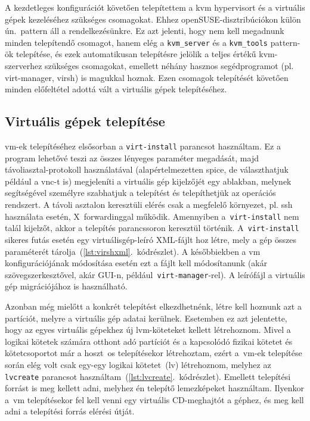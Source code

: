 A kezdetleges konfigurációt követően telepítettem a \acrshort{kvm} \gls{hypervisor}t és a virtuális gépek kezeléséhez szükséges csomagokat. Ehhez openSUSE-disztribúciókon külön ún.~pattern áll a rendelkezésünkre. Ez azt jelenti, hogy nem kell megadnunk minden telepítendő csomagot, hanem elég a \texttt{kvm\_server} és a \texttt{kvm\_tools} pattern-ök telepítése, és ezek automatikusan telepítésre jelölik a teljes értékű \acrshort{kvm}-szerverhez szükséges csomagokat, emellett néhány hasznos segédprogramot (pl. virt-manager, virsh) is magukkal hoznak. Ezen csomagok telepítését követően minden előfeltétel adottá vált a virtuális gépek telepítéséhez.


\subsection{Virtuális gépek telepítése}
\acrshort{vm}-ek telepítéséhez elsősorban a \texttt{virt-install} parancsot használtam. Ez a program lehetővé teszi az összes lényeges paraméter megadását, majd távoliasztal-protokoll használatával (alapértelmezetten \acrshort{spice}, de választhatjuk például a \acrshort{vnc}-t is) megjeleníti a virtuális gép kijelzőjét egy ablakban, melynek segítségével személyre szabhatjuk a telepítést és telepíthetjük az operációs rendszert. A távoli asztalon keresztüli elérés csak a megfelelő környezet, pl. \acrshort{ssh} használata esetén, X~forwardinggal működik. Amennyiben a~\texttt{virt-install} nem talál kijelzőt, akkor a telepítés parancssoron keresztül történik. A~\texttt{virt-install} sikeres futás esetén egy virtuálisgép-leíró XML-fájlt hoz létre, mely a gép összes paraméterét tárolja~(\ref{lst:virshxml}.~kódrészlet). A későbbiekben a \acrshort{vm} konfigurációjának módosítása esetén ezt a fájlt kell módosítanunk (akár szövegszerkesztővel, akár GUI-n, például~\texttt{virt-manager}-rel). A leírófájl a virtuális gép migrációjához is használható.

\vspace{2mm}
\begin{figure}[htb]
	
\end{figure}

Azonban még mielőtt a konkrét telepítést elkezdhetnénk, létre kell hoznunk azt a partíciót, melyre a virtuális gép adatai kerülnek. Esetemben ez azt jelentette, hogy az egyes virtuális gépekhez új \acrshort{lvm}-köteteket kellett létrehoznom. Mivel a logikai kötetek számára otthont adó partíciót és a kapcsolódó fizikai kötetet és kötetcsoportot már a hoszt~\acrshort{os} telepítésekor létrehoztam, ezért a~\acrshort{vm}-ek telepítése során elég volt csak egy-egy logikai kötetet~(\acrshort{lv}) létrehoznom, melyhez az \texttt{lvcreate} parancsot használtam~(\ref{lst:lvcreate}.~kódrészlet).
Emellett telepítési forrást is meg kellett adni, melyhez én telepítő lemezképeket használtam. Ilyenkor a~\acrshort{vm} telepítésekor fel kell venni egy virtuális CD-meghajtót a géphez, és meg kell adni a telepítési forrás elérési útját.

